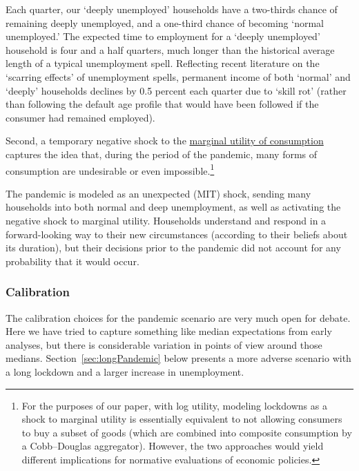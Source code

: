 \documentclass[titlepage,a4paper]{\econtex}
\begin{document}
Each quarter, our `deeply unemployed' households have a two-thirds chance of remaining deeply unemployed, and a one-third chance of becoming `normal unemployed.'
The expected time to employment for a `deeply unemployed' household is four and a half quarters, much longer than the historical average length of a typical unemployment spell.  Reflecting recent literature on the `scarring effects' of unemployment spells, permanent income of both `normal' and `deeply' households declines by 0.5 percent each quarter due to `skill rot' (rather than following the default age profile that would have been followed if the consumer had remained employed).

Second, a temporary negative shock to the \href{https://www.investopedia.com/terms/m/marginalutility.asp}{marginal utility of consumption} captures the idea that, during the period of the pandemic, many forms of consumption are undesirable or even impossible.\footnote{For the purposes of our paper, with log utility, modeling lockdowns as a shock to marginal utility is essentially equivalent to not allowing consumers to buy a subset of goods (which are combined into composite consumption by a Cobb--Douglas aggregator). However, the two approaches would yield different implications for normative evaluations of economic policies.}

The pandemic is modeled as an unexpected (MIT) shock, sending many households into both normal and deep unemployment, as well as activating the negative shock to marginal utility. Households understand and respond in a forward-looking way to their new circumstances (according to their beliefs about its duration), but their decisions prior to the pandemic did not account for any probability that it would occur.

\subsubsection{Calibration}
The calibration choices for the pandemic scenario are very much open for debate. Here we have tried to capture something like median expectations from early analyses, but there is considerable variation in points of view around those medians.
Section~\ref{sec:longPandemic} below presents a more adverse scenario with a long lockdown and a larger increase in unemployment.
\end{document}
